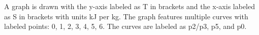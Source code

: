 A graph is drawn with the y-axis labeled as T in brackets and the x-axis labeled as S in brackets with units kJ per kg. The graph features multiple curves with labeled points: 0, 1, 2, 3, 4, 5, 6. The curves are labeled as p2/p3, p5, and p0.